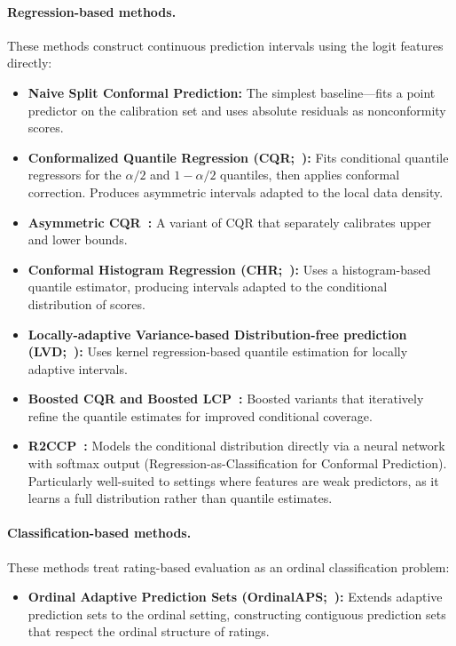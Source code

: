 \documentclass{article}
\begin{document}
\paragraph{Regression-based methods.} These methods construct continuous prediction intervals using the logit features directly:
\begin{itemize}[leftmargin=*,itemsep=1pt,topsep=2pt]
\item \textbf{Naive Split Conformal Prediction:} The simplest baseline---fits a point predictor on the calibration set and uses absolute residuals as nonconformity scores.
\item \textbf{Conformalized Quantile Regression (CQR;~\citealp{romano2019conformalized}):} Fits conditional quantile regressors for the $\alpha/2$ and $1-\alpha/2$ quantiles, then applies conformal correction. Produces asymmetric intervals adapted to the local data density.
\item \textbf{Asymmetric CQR~\citep{sesia2020comparison}:} A variant of CQR that separately calibrates upper and lower bounds.
\item \textbf{Conformal Histogram Regression (CHR;~\citealp{sesia2021conformal}):} Uses a histogram-based quantile estimator, producing intervals adapted to the conditional distribution of scores.
\item \textbf{Locally-adaptive Variance-based Distribution-free prediction (LVD;~\citealp{lin2021locally}):} Uses kernel regression-based quantile estimation for locally adaptive intervals.
\item \textbf{Boosted CQR and Boosted LCP~\citep{xie2024boosted}:} Boosted variants that iteratively refine the quantile estimates for improved conditional coverage.
\item \textbf{R2CCP~\citep{guha2024conformal}:} Models the conditional distribution directly via a neural network with softmax output (Regression-as-Classification for Conformal Prediction). Particularly well-suited to settings where features are weak predictors, as it learns a full distribution rather than quantile estimates.
\end{itemize}

\paragraph{Classification-based methods.} These methods treat rating-based evaluation as an ordinal classification problem:
\begin{itemize}[leftmargin=*,itemsep=1pt,topsep=2pt]
\item \textbf{Ordinal Adaptive Prediction Sets (OrdinalAPS;~\citealp{lu2022fair}):} Extends adaptive prediction sets to the ordinal setting, constructing contiguous prediction sets that respect the ordinal structure of ratings.
\end{itemize}
\end{document}
